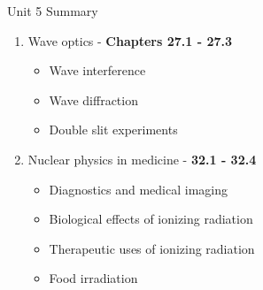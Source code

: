 \documentclass{beamer}
\begin{document}
\begin{frame}{Unit 5 Summary}
\begin{enumerate}
\item Wave optics - \textbf{Chapters 27.1 - 27.3}
\begin{itemize}
\item Wave interference
\item Wave diffraction
\item Double slit experiments
\end{itemize}
\item Nuclear physics in medicine - \textbf{32.1 - 32.4}
\begin{itemize}
\item Diagnostics and medical imaging
\item Biological effects of ionizing radiation
\item Therapeutic uses of ionizing radiation
\item Food irradiation
\end{itemize}
\end{enumerate}
\end{frame}
\end{document}
